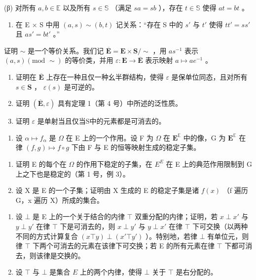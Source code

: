 (β) 对所有 \(a, b \in \mathbb{E}\) 以及所有 \(s \in \mathbb{S}\) （满足 \(sa = sb\) ），存在 \(t \in \mathbb{S}\) 使得 \(at = bt\) 。

\begin{enumerate}
\def\labelenumi{(\alph{enumi})}
\tightlist
\item
  在 E × S 中用 \((a, s) \sim (b, t)\) 记关系：“存在 S 中的 \(s'\) 与 \(t'\) 使得 \(tt' = ss'\) 且 \(as' = bt'\) 。”
\end{enumerate}

证明 \(\sim\) 是一个等价关系。我们记 \(\overline{\mathbf{E}} = \mathbf{E} \times \mathbf{S}/\sim\) ，用 \(as^{-1}\) 表示 \((a, s) (\text{mod } \sim)\) 的等价类，并用 \(\varepsilon: \mathbf{E} \to \overline{\mathbf{E}}\) 表示映射 \(a \mapsto ae^{-1}\) 。

\begin{enumerate}
\def\labelenumi{(\alph{enumi})}
\setcounter{enumi}{1}
\item
  证明在 \(\overline{\mathbf{E}}\) 上存在一种且仅一种幺半群结构，使得 \(\varepsilon\) 是保单位同态，且对所有 \(s \in \mathbf{S}\) ， \(\varepsilon(s)\) 是可逆的。
\item
  证明 \((\overline{\mathbf{E}},\varepsilon)\) 具有定理 1（第 4 号）中所述的泛性质。
\item
  证明 \(\varepsilon\) 是单射当且仅当S中的元素都是可消去的。
\end{enumerate}

\BourbakiExercisesSection

\begin{enumerate}
\def\labelenumi{\arabic{enumi}.}
\tightlist
\item
  设 \(\alpha \mapsto f_{\alpha}\) 是 \(\Omega\) 在 E 上的一个作用。设 F 为 \(\Omega\) 在 \(\mathbf{E}^{\mathbb{E}}\) 中的像，G 为 \(\mathbf{E}^{\mathbb{E}}\) 在律 \((f,g) \mapsto f \circ g\) 下由 F 与 E 的恒等映射生成的稳定子集。
\end{enumerate}

\begin{enumerate}
\def\labelenumi{(\alph{enumi})}
\item
  证明 E 的每个在 \(\Omega\) 的作用下稳定的子集，在 \(E^{E}\) 在 E 上的典范作用限制到 G 上之下也是稳定的（第 1 号，例 3）。
\item
  设 X 是 E 的一个子集；证明由 X 生成的 E 的稳定子集是诸 \(f(x)\) （f 遍历 G，x 遍历 X）所成的集合。
\end{enumerate}

\begin{enumerate}
\def\labelenumi{\arabic{enumi}.}
\setcounter{enumi}{1}
\item
  设 \(\bot\) 是 E 上的一个关于结合的内律 \(\top\) 双重分配的内律；证明，若 \(x \perp x'\) 与 \(y \perp y'\) 在律 \(\top\) 下是可消去的，则 \(x \perp y'\) 与 \(y \perp x'\) 在律 \(\top\) 下可交换（以两种不同的方式计算复合 \((x \top y) \perp (x' \top y')\) ）。特别地，若律 \(\bot\) 有单位元，则律 \(\top\) 下两个可消去的元素在该律下可交换；若 E 的所有元素在律 \(\top\) 下都可消去，则该律是交换的。
\item
  设 \(\top\) 与 \(\bot\) 是集合 \(E\) 上的两个内律，使得 \(\bot\) 关于 \(\top\) 是右分配的。
\end{enumerate}

